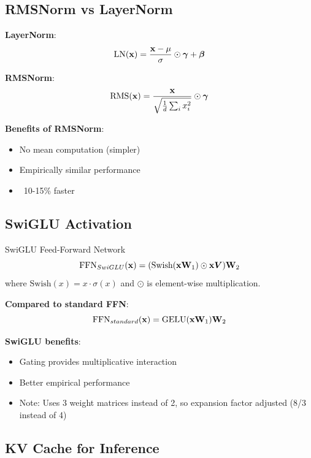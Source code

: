 \subsection{RMSNorm vs LayerNorm}

\textbf{LayerNorm}:
\begin{equation}
\text{LN}(\mathbf{x}) = \frac{\mathbf{x} - \mu}{\sigma} \odot \bm{\gamma} + \bm{\beta}
\end{equation}

\textbf{RMSNorm}:
\begin{equation}
\text{RMS}(\mathbf{x}) = \frac{\mathbf{x}}{\sqrt{\frac{1}{d}\sum_i x_i^2}} \odot \bm{\gamma}
\end{equation}

\textbf{Benefits of RMSNorm}:
\begin{itemize}
    \item No mean computation (simpler)
    \item Empirically similar performance
    \item ~10-15\% faster
\end{itemize}

\subsection{SwiGLU Activation}

\begin{mathresult}{SwiGLU Feed-Forward Network}
\begin{equation}
\text{FFN}_{SwiGLU}(\mathbf{x}) = (\text{Swish}(\mathbf{x}\mathbf{W}_1) \odot \mathbf{x}\bm{V}) \mathbf{W}_2
\end{equation}
where $\text{Swish}(x) = x \cdot \sigma(x)$ and $\odot$ is element-wise multiplication.
\end{mathresult}

\textbf{Compared to standard FFN}:
\begin{equation}
\text{FFN}_{standard}(\mathbf{x}) = \text{GELU}(\mathbf{x}\mathbf{W}_1)\mathbf{W}_2
\end{equation}

\textbf{SwiGLU benefits}:
\begin{itemize}
    \item Gating provides multiplicative interaction
    \item Better empirical performance
    \item Note: Uses 3 weight matrices instead of 2, so expansion factor adjusted (8/3 instead of 4)
\end{itemize}

\subsection{KV Cache for Inference}

